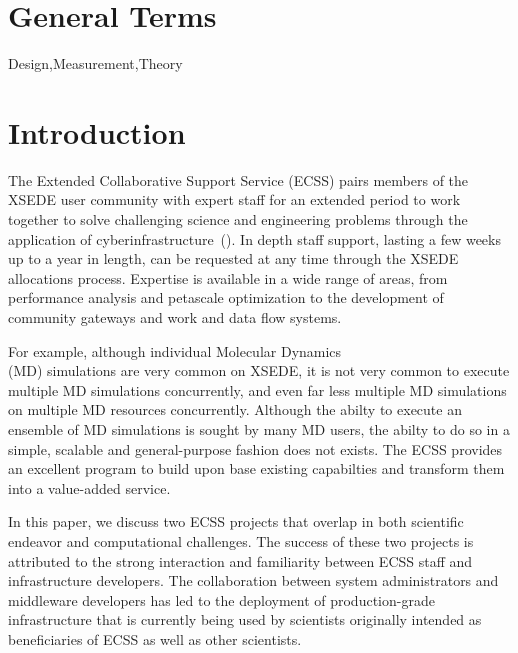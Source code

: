\documentclass{sig-alternate}
\begin{document}

\section*{General Terms}{Design,Measurement,Theory}


\section{Introduction}



The Extended Collaborative Support Service (ECSS) pairs members of the XSEDE
user community with expert staff for an extended period to work together to
solve challenging science and engineering problems through the application of
cyberinfrastructure~(\cite{ECSS_webpage}). In depth staff support, lasting a few
weeks up to a year in length, can be requested at any time through the XSEDE
allocations process. Expertise is available in a wide range of areas, from
performance analysis and petascale optimization to the development of community
gateways and work and data flow systems.

For example, although individual Molecular Dynamics \\(MD) simulations
are very common on XSEDE, it is not very common to execute multiple MD
simulations concurrently, and even far less multiple MD simulations on
multiple MD resources concurrently. Although the abilty to execute an
ensemble of MD simulations is sought by many MD users, the abilty to
do so in a simple, scalable and general-purpose fashion does not
exists.  The ECSS provides an excellent program to build upon base
existing capabilties and transform them into a value-added service.

In this paper, we discuss two ECSS projects that overlap in both
scientific endeavor and computational challenges. The success of these
two projects is attributed to the strong interaction and familiarity
between ECSS staff and infrastructure developers. The collaboration
between system administrators and middleware developers has led to the
deployment of production-grade infrastructure that is currently being
used by scientists originally intended as beneficiaries of ECSS as well
as other scientists.
\end{document}
